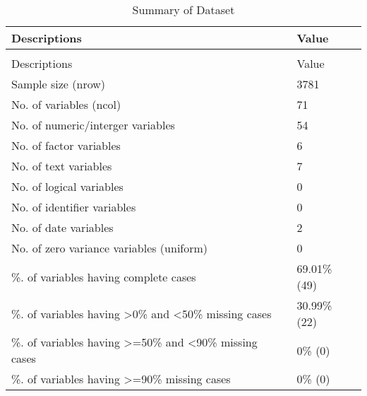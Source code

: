 \begingroup\fontsize{9}{11}\selectfont

\begin{longtable}[t]{ll}
\caption{Summary of Dataset}\\
\toprule
Descriptions & Value\\
\midrule
\endfirsthead
\caption[]{Summary of Dataset }\\
\toprule
Descriptions & Value\\
\midrule
\endhead

\endfoot
\bottomrule
\endlastfoot
Sample size (nrow) & 3781\\
No. of variables (ncol) & 71\\
No. of numeric/interger variables & 54\\
No. of factor variables & 6\\
No. of text variables & 7\\
No. of logical variables & 0\\
No. of identifier variables & 0\\
No. of date variables & 2\\
No. of zero variance variables (uniform) & 0\\
\%. of variables having complete cases & 69.01\% (49)\\
\%. of variables having >0\% and <50\% missing cases & 30.99\% (22)\\
\%. of variables having >=50\% and <90\% missing cases & 0\% (0)\\
\%. of variables having >=90\% missing cases & 0\% (0)\\*
\end{longtable}
\endgroup{}
